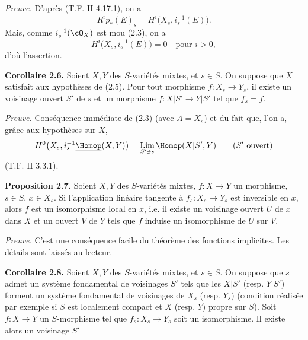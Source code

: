 \emph{Preuve.} D'après (T.F. II 4.17.1), on a
\[
  R^i p_*(E)_s=H^i\bigl(X_s,i_s^{-1}(E)\bigr).
\]
Mais, comme $i_s^{-1}(\cO_X)$ est mou (2.3), on a
\[
  H^i\bigl(X_s,i_s^{-1}(E)\bigr)=0\quad \text{pour } i>0,
\]
d'où l'assertion.

\textbf{Corollaire 2.6.} Soient $X,Y$ des $S$-variétés mixtes, et $s\in S$. On suppose que $X$ satisfait aux hypothèses de (2.5). Pour tout morphisme $f:X_s\to Y_s$, il existe un voisinage ouvert $S'$ de $s$ et un morphisme $\bar f:X|S'\longrightarrow Y|S'$ tel que $\bar f_s=f$.

\emph{Preuve.} Conséquence immédiate de (2.3) (avec $A=X_s$) et du fait que, l'on a, grâce aux hypothèses sur $X$,
\[
  H^0\bigl(X_s,i_s^{-1}\underline{\Homop}(X,Y)\bigr)
  =\operatorname*{Lim}_{S'\ni s}\Homop(X|S',Y)\qquad (S'\ \text{ouvert})
\]
(T.F. II 3.3.1).

\textbf{Proposition 2.7.} Soient $X,Y$ des $S$-variétés mixtes, $f:X\to Y$ un morphisme, $s\in S$, $x\in X_s$. Si l'application linéaire tangente à $f_s:X_s\to Y_s$ est inversible en $x$, alors $f$ est un isomorphisme local en $x$, i.e. il existe un voisinage ouvert $U$ de $x$ dans $X$ et un ouvert $V$ de $Y$ tels que $f$ induise un isomorphisme de $U$ sur $V$.

\emph{Preuve.} C'est une conséquence facile du théorème des fonctions implicites. Les détails sont laissés au lecteur.

\textbf{Corollaire 2.8.} Soient $X,Y$ des $S$-variétés mixtes, et $s\in S$. On suppose que $s$ admet un système fondamental de voisinages $S'$ tels que les $X|S'$ (resp. $Y|S'$) forment un système fondamental de voisinages de $X_s$ (resp. $Y_s$) (condition réalisée par exemple si $S$ est localement compact et $X$ (resp. $Y$) propre sur $S$). Soit $f:X\to Y$ un $S$-morphisme tel que $f_s:X_s\to Y_s$ soit un isomorphisme. Il existe alors un voisinage $S'$ 

